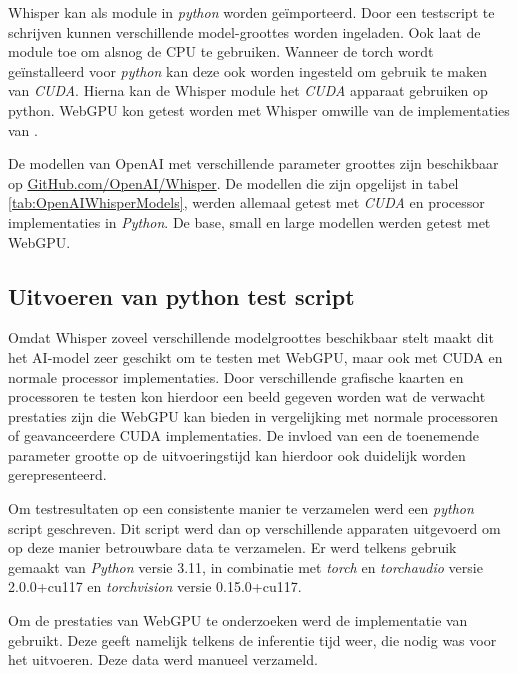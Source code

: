 \bigbreak{}

Whisper kan als module in \textit{python} worden geïmporteerd. Door een testscript te schrijven kunnen verschillende model-groottes worden ingeladen. Ook laat de module toe om alsnog de CPU te gebruiken. Wanneer de torch wordt geïnstalleerd voor \textit{python} kan deze ook worden ingesteld om gebruik te maken van \textit{CUDA}. Hierna kan de Whisper module het \textit{CUDA} apparaat gebruiken op python. WebGPU kon getest worden met Whisper omwille van de implementaties van \textcite{Fleetwood2024, Fleetwood2023b}.

\bigbreak{}

De modellen van OpenAI met verschillende parameter groottes zijn beschikbaar op \href{https://github.com/openai/whisper}{GitHub.com/OpenAI/Whisper}. De modellen die zijn opgelijst in tabel \ref{tab:OpenAIWhisperModels}, werden allemaal getest met \textit{CUDA} en processor implementaties in \textit{Python}. De base, small en large modellen werden getest met WebGPU.

\break{}

\subsection*{Uitvoeren van python test script}

Omdat Whisper zoveel verschillende modelgroottes beschikbaar stelt maakt dit het AI-model zeer geschikt om te testen met WebGPU, maar ook met CUDA en normale processor implementaties. Door verschillende grafische kaarten en processoren te testen kon hierdoor een beeld gegeven worden wat de verwacht prestaties zijn die WebGPU kan bieden in vergelijking met normale processoren of geavanceerdere CUDA implementaties. De invloed van een de toenemende parameter grootte op de uitvoeringstijd kan hierdoor ook duidelijk worden gerepresenteerd.

\bigbreak{}

Om testresultaten op een consistente manier te verzamelen werd een \textit{python} script geschreven. Dit script werd dan op verschillende apparaten uitgevoerd om op deze manier betrouwbare data te verzamelen. Er werd telkens gebruik gemaakt van \textit{Python} versie 3.11, in combinatie met \textit{torch} en \textit{torchaudio} versie 2.0.0+cu117 en \textit{torchvision} versie 0.15.0+cu117.

\bigbreak{}

Om de prestaties van WebGPU te onderzoeken werd de implementatie van \textcite{Fleetwood2024} gebruikt. Deze geeft namelijk telkens de inferentie tijd weer, die nodig was voor het uitvoeren. Deze data werd manueel verzameld.

